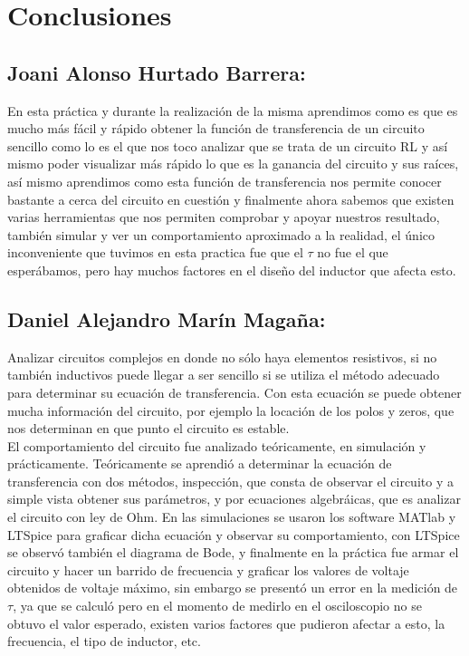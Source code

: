 \documentclass{report}
\newcounter{ns}
\begin{document}
\section{Conclusiones}
	\subsection{Joani Alonso Hurtado Barrera:}
	En esta práctica y durante la realización de la misma aprendimos como es que es mucho más fácil y rápido obtener la función de transferencia de un circuito sencillo como lo es el que nos toco analizar que se trata de un circuito RL y así mismo poder visualizar más rápido lo que es la ganancia del circuito y sus raíces, así mismo aprendimos como esta función de transferencia nos permite conocer bastante a cerca del circuito en cuestión y finalmente ahora sabemos que existen varias herramientas que nos permiten comprobar y apoyar nuestros resultado, también simular y ver un comportamiento aproximado a la realidad, el único inconveniente que tuvimos en esta practica fue que el $\tau$ no fue el que esperábamos, pero hay muchos factores en el diseño del inductor que afecta esto. 
	
	\subsection{Daniel Alejandro Marín Magaña:}
	Analizar circuitos complejos en donde no sólo haya elementos resistivos, si no también inductivos puede llegar a ser sencillo si se utiliza el método adecuado para determinar su ecuación de transferencia. Con esta ecuación se puede obtener mucha información del circuito, por ejemplo la locación de los polos y zeros, que nos determinan en que punto el circuito es estable.\\
	El comportamiento del circuito fue analizado teóricamente, en simulación y prácticamente. Teóricamente se aprendió a determinar la ecuación de transferencia con dos métodos, inspección, que consta de observar el circuito y a simple vista obtener sus parámetros, y por ecuaciones algebráicas, que es analizar el circuito con ley de Ohm. En las simulaciones se usaron los software MATlab y LTSpice para graficar dicha ecuación y observar su comportamiento, con LTSpice se observó también el diagrama de Bode, y finalmente en la práctica fue armar el circuito y hacer un barrido de frecuencia y graficar los valores de voltaje obtenidos de voltaje máximo, sin embargo se presentó un error en la medición de $\tau$, ya que se calculó pero en el momento de medirlo en el osciloscopio no se obtuvo el valor esperado, existen varios factores que pudieron afectar a esto, la frecuencia, el tipo de inductor, etc.
\end{document}
